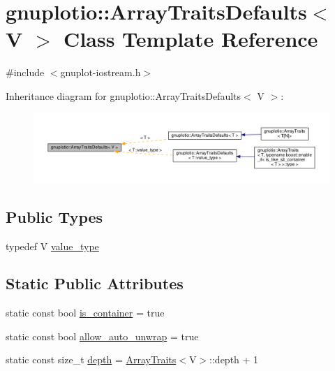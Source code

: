 \hypertarget{classgnuplotio_1_1_array_traits_defaults}{}\section{gnuplotio\+:\+:Array\+Traits\+Defaults$<$ V $>$ Class Template Reference}
\label{classgnuplotio_1_1_array_traits_defaults}


{\ttfamily \#include $<$gnuplot-\/iostream.\+h$>$}



Inheritance diagram for gnuplotio\+:\+:Array\+Traits\+Defaults$<$ V $>$\+:
\nopagebreak
\begin{figure}[H]
\begin{center}
\leavevmode
\includegraphics[width=350pt]{classgnuplotio_1_1_array_traits_defaults__inherit__graph}
\end{center}
\end{figure}
\subsection*{Public Types}
\begin{DoxyCompactItemize}
\item 
typedef V \hyperlink{classgnuplotio_1_1_array_traits_defaults_ad7a9e8d19419fabe2ab9cc1b76c9965b}{value\+\_\+type}
\end{DoxyCompactItemize}
\subsection*{Static Public Attributes}
\begin{DoxyCompactItemize}
\item 
static const bool \hyperlink{classgnuplotio_1_1_array_traits_defaults_a57bab5bf3617f0ee66fdd4dcb751aa21}{is\+\_\+container} = true
\item 
static const bool \hyperlink{classgnuplotio_1_1_array_traits_defaults_ac8d430cba6ceefc6f52706455f12a0e8}{allow\+\_\+auto\+\_\+unwrap} = true
\item 
static const size\+\_\+t \hyperlink{classgnuplotio_1_1_array_traits_defaults_ac51367f5da9096249b162af1496e36ab}{depth} = \hyperlink{classgnuplotio_1_1_array_traits}{Array\+Traits}$<$V$>$\+::depth + 1
\end{DoxyCompactItemize}



